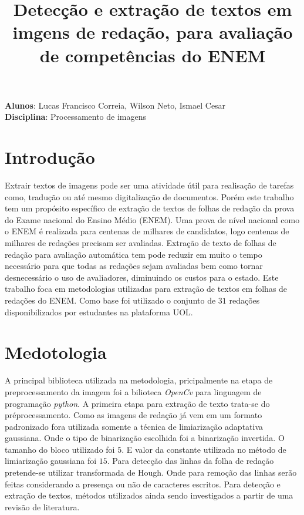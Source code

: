 \documentclass[12pt,a4]{article}
\title{Detecção e extração de textos em imgens de redação, para avaliação de competências do ENEM}
\date{}
\begin{document}
\maketitle
\begin{center}
\textbf{Alunos}: Lucas Francisco Correia, Wilson Neto,  Ismael Cesar \\
\textbf{Disciplina}: Processamento de imagens
\end{center}


\section{Introdução}
\label{sec:introdcao}
	Extrair textos de imagens pode ser uma atividade útil para realisação de tarefas como, tradução ou até mesmo digitalização de documentos.
	Porém este trabalho tem um propósito específico de extração de textos de folhas de redação da prova do Exame nacional do Ensino Médio (ENEM).
	Uma prova de nível nacional como o ENEM é realizada para centenas de milhares de candidatos, logo centenas de milhares de redações precisam ser avaliadas.
	Extração de texto de folhas de redação para avaliação automática tem pode reduzir em muito o tempo necessário para que todas as redações sejam avaliadas bem como tornar desnecessário o uso de avaliadores, diminuindo os custos para o estado. 
	Este trabalho foca em metodologias utilizadas para extração de textos em folhas de redações do ENEM.
	Como base foi utilizado o conjunto de $31$ redações disponibilizados por estudantes na plataforma UOL. 
	

\section{Medotologia}
\label{sec:metodologia}
	A principal biblioteca utilizada na metodologia, pricipalmente na etapa de preprocessamento da imagem foi a bilioteca \textit{OpenCv}\cite{opencv_library} para linguagem de programação \textit{python}.
	A primeira etapa para extração de texto trata-se do préprocessamento. 
	Como as imagens de redação já vem em um formato padronizado fora utilizada somente a técnica de limiarização adaptativa gaussiana. 
	Onde o tipo de binarização escolhida foi a binarização invertida. 
	O tamanho do bloco utilizado foi $5$.
	E valor da constante utilizada no método de limiarização gaussiana foi $15$.
	Para detecção das linhas da folha de redação pretende-se utilizar transformada de Hough. 
	Onde para remoção das linhas serão feitas considerando a presença ou não de caracteres escritos.
	Para detecção e extração de textos, métodos utilizados ainda sendo investigados a partir de uma revisão de literatura.
		
	
	


\end{document}
